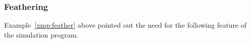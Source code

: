 \documentclass[11pt]{memoir}
\newcommand{\authnote}[3]
{\text{{ \textcolor{#3}{\( \langle\hspace{-0.2em}\langle \)\textsf{\footnotesize #1: #2}\( \rangle\hspace{-0.2em}\rangle \)}}}}
\newcommand{\authnote}[2]{}
\newcommand{\Pnote}[1]{{\authnote{P}{#1}{cyan}}}
\theoremstyle{definition} %
\newtheorem{Premark}{\color{cyan}Peter remark}
\newenvironment{premark}{\begin{Premark}\color{cyan}}{\varqed\end{Premark}}
\renewcommand{\Pnote}[1]{\begin{premark}#1\end{premark}}
\newcommand{\fld}[1]{\ensuremath{\textit{#1\/}}}
\def\B{B}
\newcommand{\Q}{Q}
\newcommand{\Z}{Z}
\newcommand{\ZigDepth}{\fld{ZigDepth}}
\begin{document}

\subsubsection{Feathering}\label{sec:feathering}

Example~\ref{xmp:feather} above pointed out the need for the following feature of the simulation program.




\end{document}
